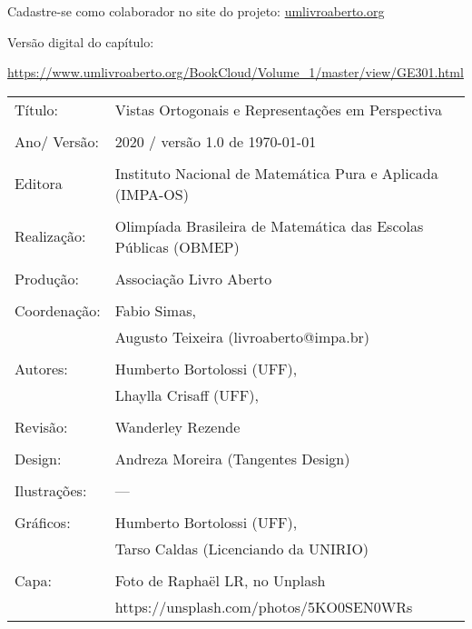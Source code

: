 Cadastre-se como colaborador no site do projeto: \url{umlivroaberto.org}

Versão digital do capítulo:

\url{https://www.umlivroaberto.org/BookCloud/Volume_1/master/view/GE301.html}


\begin{tabular}{p{}p{}}
Título: & Vistas Ortogonais e Representações em Perspectiva\\
\\
Ano/ Versão: & 2020 / versão 1.0 de \today\\
\\
Editora & Instituto Nacional de Matem\'atica Pura e Aplicada (IMPA-OS)\\
\\
Realização:& Olimp\'iada Brasileira de Matem\'atica das Escolas P\'ublicas (OBMEP)\\
\\
Produção:& Associação Livro Aberto\\
\\
Coordenação:& Fabio Simas, \\
            & Augusto Teixeira (livroaberto@impa.br)\\
\\
  Autores: & Humberto Bortolossi (UFF),\\
        & Lhaylla Crisaff (UFF),\\
             \\
Revisão: & Wanderley Rezende  \\
                
\\
Design: & Andreza Moreira (Tangentes Design) \\
\\
  Ilustrações: & --- \\ 
\\
Gráficos: & Humberto Bortolossi (UFF), \\
		      & Tarso Caldas (Licenciando da UNIRIO)\\

\\
  Capa: & Foto de Raphaël LR, no Unplash \\
  		& https://unsplash.com/photos/5KO0SEN0WRs \\

\end{tabular}

